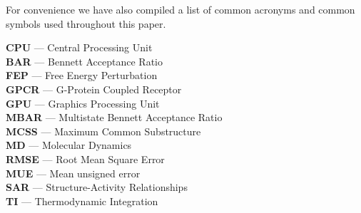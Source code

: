 \documentclass[9pt,bestpractices]{livecoms}
\begin{document}
For convenience we have also compiled a list of common acronyms and common symbols used throughout this paper.
\begin{tcolorbox}[title=Acronyms, colback=blue!10!white]
    {\bf CPU} --- Central Processing Unit\\
     {\bf BAR} --- Bennett Acceptance Ratio\\
     {\bf FEP} --- Free Energy Perturbation\\
     {\bf GPCR} --- G-Protein Coupled Receptor\\
     {\bf GPU} --- Graphics Processing Unit\\
     {\bf MBAR} --- Multistate Bennett Acceptance Ratio\\
     {\bf MCSS} --- Maximum Common Substructure\\
     {\bf MD} --- Molecular Dynamics\\
     {\bf RMSE} --- Root Mean Square Error\\
     {\bf MUE} --- Mean unsigned error\\
     {\bf SAR} --- Structure-Activity Relationships\\
     {\bf TI} --- Thermodynamic Integration
\end{tcolorbox}
\end{document}
